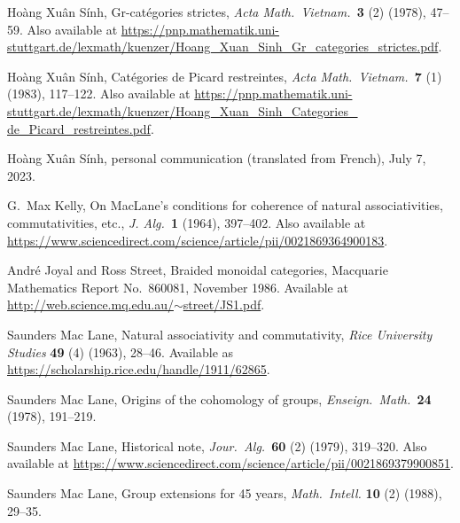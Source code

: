 \documentclass[reqno,12pt]{amsart}
\theoremstyle{definition}
\begin{document}
\begin{thebibliography}{99}
Ho\`ang Xu\^an S\'inh,  Gr-cat\'egories strictes, \textsl{Acta Math.\ Vietnam.\ }\textbf{3} (2) (1978), 47--59.  Also available at \href{https://pnp.mathematik.uni-stuttgart.de/lexmath/kuenzer/Hoang_Xuan_Sinh_Gr_categories_strictes.pdf}{https://pnp.mathematik.uni-stuttgart.de/lexmath/kuenzer/Hoang\_Xuan\_Sinh\_Gr\_categories\_strictes.pdf}.

Ho\`ang Xu\^an S\'inh,  
Cat\'egories de Picard restreintes, \textsl{Acta Math.\ Vietnam.\ }\textbf{7} (1) (1983), 117--122.   Also available at  \href{https://pnp.mathematik.uni-stuttgart.de/lexmath/kuenzer/Hoang_Xuan_Sinh_Categories_de_Picard_restreintes.pdf}{https://pnp.mathematik.uni-stuttgart.de/lexmath/kuenzer/Hoang\_Xuan\_Sinh\_Categories\_} \break
\href{https://pnp.mathematik.uni-stuttgart.de/lexmath/kuenzer/Hoang_Xuan_Sinh_Categories_de_Picard_restreintes.pdf}{de\_Picard\_restreintes.pdf}.

Ho\`ang Xu\^an S\'inh,  personal communication (translated from French), July 7, 2023.

G.\ Max Kelly, On MacLane’s conditions for coherence of natural associativities, commutativities, etc., \textsl{J. Alg.\ }\textbf{1} (1964), 397--402.  Also available at
\href{https://www.sciencedirect.com/science/article/pii/0021869364900183}{https://www.sciencedirect.com/science/article/pii/0021869364900183}.

Andr\'e Joyal and Ross Street, Braided monoidal categories,
Macquarie Mathematics Report No.\ 860081, November 1986.  Available
at \href{http://web.science.mq.edu.au/~street/JS1.pdf}{http://web.science.mq.edu.au/$\sim$street/JS1.pdf}.

Saunders  Mac Lane, Natural associativity and commutativity, \textsl{Rice University Studies} \textbf{49} (4) (1963), 28--46.  Available as \href{https://scholarship.rice.edu/handle/1911/62865}{https://scholarship.rice.edu/handle/1911/62865}.

Saunders Mac Lane, Origins of the cohomology of groups, \textsl{Enseign.\ Math.\ }\textbf{24} (1978), 191--219.

Saunders Mac Lane, Historical note, \textsl{Jour.\ Alg.\ }\textbf{60} (2) (1979), 319--320.  Also available at \hfill \break \href{https://www.sciencedirect.com/science/article/pii/0021869379900851}{https://www.sciencedirect.com/science/article/pii/0021869379900851}.

Saunders Mac Lane, Group extensions for 45 years, \textsl{Math.\ Intell.} \textbf{10} (2) (1988), 29--35.


\end{thebibliography}
\end{document}

